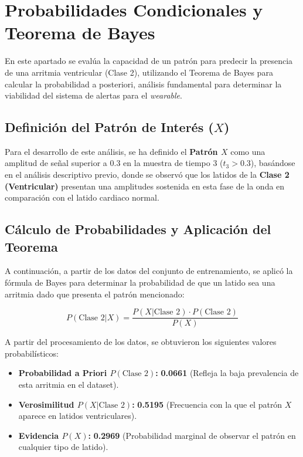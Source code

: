 \documentclass[a4paper,twocolumn]{article}
\begin{document}
	\section{Probabilidades Condicionales y Teorema de Bayes}

	En este apartado se evalúa la capacidad de un patrón para predecir la presencia de una arritmia ventricular (Clase 2), utilizando el Teorema de Bayes para calcular la probabilidad a posteriori,
	análisis fundamental para determinar la viabilidad del sistema de alertas para el \textit{wearable}.

	\subsection{Definición del Patrón de Interés ($X$)}
	Para el desarrollo de este análisis, se ha definido el \textbf{Patrón $X$} como una amplitud de señal superior a $0.3$ en la muestra de tiempo $3$ ($t_{3} > 0.3$), basándose 
	en el análisis descriptivo previo, donde se observó que los latidos de la \textbf{Clase 2 (Ventricular)} presentan una amplitudes sostenida en esta 
	fase de la onda en comparación con el latido cardiaco normal.

	\subsection{Cálculo de Probabilidades y Aplicación del Teorema}
	A continuación, a partir de los datos del conjunto de entrenamiento, se aplicó la fórmula de Bayes para determinar la probabilidad de que un latido sea una arritmia dado que presenta el patrón mencionado:

	\begin{equation}
	P(\text{Clase 2} | X) = \frac{P(X | \text{Clase 2}) \cdot P(\text{Clase 2})}{P(X)}
	\end{equation}

	A partir del procesamiento de los datos, se obtuvieron los siguientes valores probabilísticos:

	\begin{itemize}
		\item \textbf{Probabilidad a Priori $P(\text{Clase 2})$:} \textbf{0.0661} (Refleja la baja prevalencia de esta arritmia en el dataset).
		\item \textbf{Verosimilitud $P(X | \text{Clase 2})$:} \textbf{0.5195} (Frecuencia con la que el patrón $X$ aparece en latidos ventriculares).
		\item \textbf{Evidencia $P(X)$:} \textbf{0.2969} (Probabilidad marginal de observar el patrón en cualquier tipo de latido).
	\end{itemize}
\end{document}
